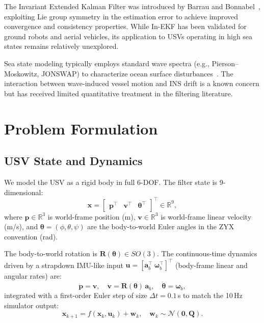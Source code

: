 \documentclass[conference]{IEEEtran}
\begin{document}
The Invariant Extended Kalman Filter was introduced by Barrau and Bonnabel~\cite{barrau2017invariant}, exploiting Lie group symmetry in the estimation error to achieve improved convergence and consistency properties. While In-EKF has been validated for ground robots and aerial vehicles, its application to USVs operating in high sea states remains relatively unexplored.

Sea state modeling typically employs standard wave spectra (e.g., Pierson--Moskowitz, JONSWAP) to characterize ocean surface disturbances~\cite{fossen2011handbook}. The interaction between wave-induced vessel motion and INS drift is a known concern but has received limited quantitative treatment in the filtering literature.

\section{Problem Formulation}
\label{sec:problem}

\subsection{USV State and Dynamics}

We model the USV as a rigid body in full 6-DOF. The filter state is 9-dimensional:
\begin{equation}
  \mathbf{x} = \begin{bmatrix} \mathbf{p}^\top & \mathbf{v}^\top & \boldsymbol{\theta}^\top \end{bmatrix}^\top \in \mathbb{R}^9,
  \label{eq:state}
\end{equation}
where $\mathbf{p} \in \mathbb{R}^3$ is world-frame position (m), $\mathbf{v} \in \mathbb{R}^3$ is world-frame linear velocity (m/s), and $\boldsymbol{\theta} = (\phi, \theta, \psi)$ are the body-to-world Euler angles in the ZYX convention (rad).

The body-to-world rotation is $\mathbf{R}(\boldsymbol{\theta}) \in SO(3)$. The continuous-time dynamics driven by a strapdown IMU-like input $\mathbf{u} = [\mathbf{a}_b^\top\ \boldsymbol{\omega}_b^\top]^\top$ (body-frame linear and angular rates) are:
\begin{equation}
  \dot{\mathbf{p}} = \mathbf{v}, \quad
  \dot{\mathbf{v}} = \mathbf{R}(\boldsymbol{\theta})\,\mathbf{a}_b, \quad
  \dot{\boldsymbol{\theta}} = \boldsymbol{\omega}_b,
  \label{eq:dynamics}
\end{equation}
integrated with a first-order Euler step of size $\Delta t = 0.1$\,s to match the 10\,Hz simulator output:
\begin{equation}
  \mathbf{x}_{k+1} = f(\mathbf{x}_k,\mathbf{u}_k) + \mathbf{w}_k, \quad
  \mathbf{w}_k \sim \mathcal{N}(\mathbf{0}, \mathbf{Q}).
  \label{eq:process}
\end{equation}
\end{document}
